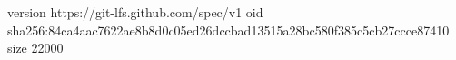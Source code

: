 version https://git-lfs.github.com/spec/v1
oid sha256:84ca4aac7622ae8b8d0c05ed26dccbad13515a28bc580f385c5cb27ccce87410
size 22000
